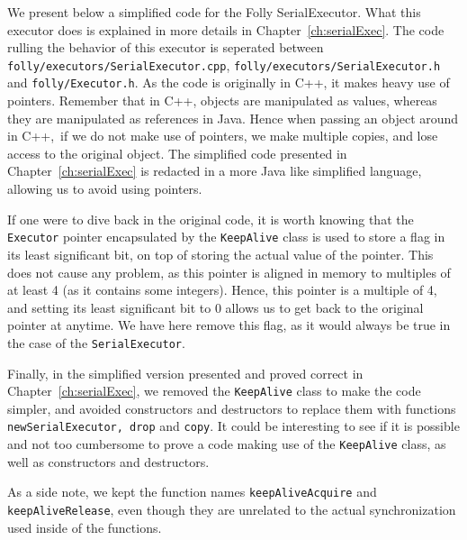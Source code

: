 We present below a simplified code for the Folly SerialExecutor. What this executor does is explained in more details in Chapter~\ref{ch:serialExec}. The code rulling the behavior of this executor is seperated between \texttt{folly/executors/SerialExecutor.cpp}, \texttt{folly/executors/SerialExecutor.h} and \texttt{folly/Executor.h}. As the code is originally in C++, it makes heavy use of pointers. Remember that in C++, objects are manipulated as values, whereas they are manipulated as references in Java. Hence when passing an object around in C++, if we do not make use of pointers, we make multiple copies, and lose access to the original object. The simplified code presented in Chapter~\ref{ch:serialExec} is redacted in a more Java like simplified language, allowing us to avoid using pointers.

If one were to dive back in the original code, it is worth knowing that the \texttt{Executor} pointer encapsulated by the \texttt{KeepAlive} class is used to store a flag in its least significant bit, on top of storing the actual value of the pointer. This does not cause any problem, as this pointer is aligned in memory to multiples of at least 4 (as it contains some integers). Hence, this pointer is a multiple of 4, and setting its least significant bit to 0 allows us to get back to the original pointer at anytime. We have here remove this flag, as it would always be true in the case of the \texttt{SerialExecutor}.

Finally, in the simplified version presented and proved correct in Chapter~\ref{ch:serialExec}, we removed the \texttt{KeepAlive} class to make the code simpler, and avoided constructors and destructors to replace them with functions \texttt{newSerialExecutor, drop} and \texttt{copy}. It could be interesting to see if it is possible and not too cumbersome to prove a code making use of the \texttt{KeepAlive} class, as well as constructors and destructors.

As a side note, we kept the function names \texttt{keepAliveAcquire} and \texttt{keepAliveRelease}, even though they are unrelated to the actual synchronization used inside of the functions.

